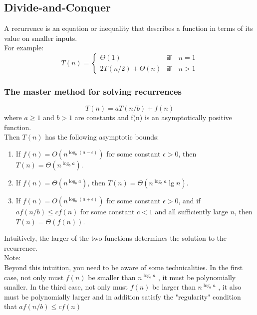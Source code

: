 \documentclass[11pt]{article}
\begin{document}
\subsection{Divide-and-Conquer}
\label{sec-2-4}
A recurrence is an equation or inequality that describes a function in terms of its value on smaller inputs. \\

For example: \\
\begin{equation}
T(n)=
\begin{cases}
\Theta(1) & \mathbb{if} \quad n=1 \\
2T(n/2) + \Theta(n) & \mathbb{if} \quad n > 1
\end{cases}
\end{equation}

\subsubsection{The master method for solving recurrences}
\label{sec-2-4-1}
\begin{equation}
T(n)=aT(n/b)+f(n)
\end{equation}
where $a\ge 1$ and $b>1$ are constants and f(n) is an asymptotically positive function. \\

Then $T(n)$ has the following asymptotic bounds: \\
\begin{enumerate}
\item If $f(n) = O(n^{\log_b(a-\epsilon)})$ for some constant $\epsilon>0$, then $T(n)=\Theta(n^{\log_ba})$. \\
\item If $f(n) = \Theta(n^{\log_ba})$, then $T(n)=\Theta(n^{\log_ba}\lg n)$. \\
\item If $f(n) = O(n^{\log_b(a+\epsilon)})$ for some constant $\epsilon>0$, and if $af(n/b)\le cf(n)$ for some constant $c<1$ and all sufficiently large $n$, then $T(n)=\Theta(f(n))$. \\
\end{enumerate}

Intuitively, the larger of the two functions determines the solution to the recurrence. \\


Note: \\
Beyond this intuition, you need to be aware of some technicalities. In the first case, not only must $f(n)$ be smaller than $n^{\log_ba}$ , it must be polynomially smaller. In the third case, not only must $f(n)$ be larger than $n^{\log_ba}$ , it also must be polynomially larger and in addition satisfy the "regularity" condition that $af(n/b)\le cf(n)$ \\
\end{document}
